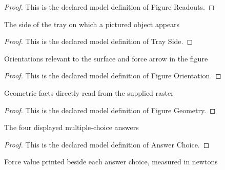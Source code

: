 \begin{proof}
  This is the declared model definition of Figure Readouts.
\end{proof}
\begin{definition}
  \label{def:physics:phyx-mini-0804:phyxminiproblems-problemphyxmini0804-trayside}
  The side of the tray on which a pictured object appears
\end{definition}
\begin{proof}
  This is the declared model definition of Tray Side.
\end{proof}
\begin{definition}
  \label{def:physics:phyx-mini-0804:phyxminiproblems-problemphyxmini0804-figureorientation}
  Orientations relevant to the surface and force arrow in the figure
\end{definition}
\begin{proof}
  This is the declared model definition of Figure Orientation.
\end{proof}
\begin{definition}
  \label{def:physics:phyx-mini-0804:phyxminiproblems-problemphyxmini0804-figuregeometry}
  Geometric facts directly read from the supplied raster
\end{definition}
\begin{proof}
  This is the declared model definition of Figure Geometry.
\end{proof}
\begin{definition}
  \label{def:physics:phyx-mini-0804:phyxminiproblems-problemphyxmini0804-answerchoice}
  The four displayed multiple-choice answers
\end{definition}
\begin{proof}
  This is the declared model definition of Answer Choice.
\end{proof}
\begin{definition}
  \label{def:physics:phyx-mini-0804:phyxminiproblems-problemphyxmini0804-displayedforceinnewtons}
  Force value printed beside each answer choice, measured in newtons
\end{definition}
